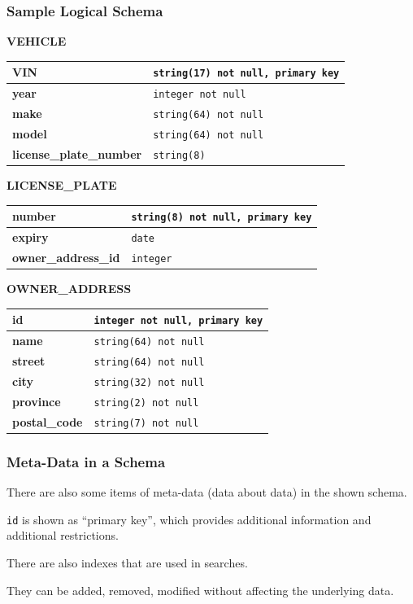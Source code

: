\begin{frame}
\frametitle{Sample Logical Schema}


	\textbf{VEHICLE}\\
	\begin{tabular}{|l|l|}\hline
		\textbf{VIN} & \texttt{string(17) not null, primary key}\\ \hline		
		\textbf{year} & \texttt{integer not null}\\ \hline
		\textbf{make} & \texttt{string(64) not null}\\ \hline
		\textbf{model} & \texttt{string(64) not null}\\ \hline		
		\textbf{license\_plate\_number} & \texttt{string(8)}\\ \hline		
	\end{tabular}
	
	\textbf{LICENSE\_PLATE}\\
	\begin{tabular}{|l|l|}\hline
		\textbf{number} & \texttt{string(8) not null, primary key}\\ \hline
		\textbf{expiry} & \texttt{date} \\ \hline
		\textbf{owner\_address\_id} & \texttt{integer}\\ \hline		
	\end{tabular}
	
		\textbf{OWNER\_ADDRESS}\\
	\begin{tabular}{|l|l|}\hline
		\textbf{id} & \texttt{integer not null,  primary key}\\ \hline
		\textbf{name} & \texttt{string(64) not null}\\ \hline
		\textbf{street} & \texttt{string(64) not null}\\ \hline
		\textbf{city} & \texttt{string(32) not null}\\ \hline
		\textbf{province} & \texttt{string(2) not null}\\ \hline
		\textbf{postal\_code} & \texttt{string(7) not null}\\ \hline

	\end{tabular}

\end{frame}



\begin{frame}
\frametitle{Meta-Data in a Schema}

There are also some items of meta-data (data about data) in the shown schema.

\texttt{id} is shown as ``primary key'', which provides additional information and additional restrictions.

There are also indexes that are used in searches. 

They can be added, removed, modified without affecting the underlying data.


\end{frame}



